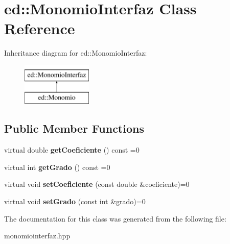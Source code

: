 \hypertarget{classed_1_1MonomioInterfaz}{\section{ed\-:\-:Monomio\-Interfaz Class Reference}
\label{classed_1_1MonomioInterfaz}
}
Inheritance diagram for ed\-:\-:Monomio\-Interfaz\-:\begin{figure}[H]
\begin{center}
\leavevmode
\includegraphics[height=2.000000cm]{classed_1_1MonomioInterfaz}
\end{center}
\end{figure}
\subsection*{Public Member Functions}
\begin{DoxyCompactItemize}
\item 
\hypertarget{classed_1_1MonomioInterfaz_a8dade5810b660860408169bca4b35e2e}{virtual double {\bfseries get\-Coeficiente} () const =0}\label{classed_1_1MonomioInterfaz_a8dade5810b660860408169bca4b35e2e}

\item 
\hypertarget{classed_1_1MonomioInterfaz_aa5b87185650a82784b39b9bbbaec7dcb}{virtual int {\bfseries get\-Grado} () const =0}\label{classed_1_1MonomioInterfaz_aa5b87185650a82784b39b9bbbaec7dcb}

\item 
\hypertarget{classed_1_1MonomioInterfaz_a40ba6a0dc0940f60842a319f982aac6d}{virtual void {\bfseries set\-Coeficiente} (const double \&coeficiente)=0}\label{classed_1_1MonomioInterfaz_a40ba6a0dc0940f60842a319f982aac6d}

\item 
\hypertarget{classed_1_1MonomioInterfaz_a7294c2a6a1c76ef374202e45f54f1da6}{virtual void {\bfseries set\-Grado} (const int \&grado)=0}\label{classed_1_1MonomioInterfaz_a7294c2a6a1c76ef374202e45f54f1da6}

\end{DoxyCompactItemize}


The documentation for this class was generated from the following file\-:\begin{DoxyCompactItemize}
\item 
monomiointerfaz.\-hpp\end{DoxyCompactItemize}
